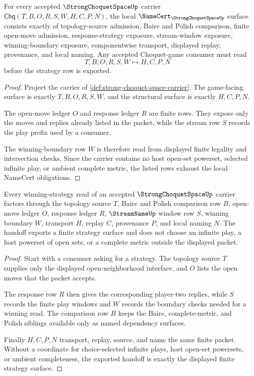 \begin{theorem}
\label{thm:strong-choquet-space-namecert-obligations}
For every accepted $\StrongChoquetSpaceUp$ carrier $\mathsf{Chq}(T,B,O,R,S,W,H,C,P,N)$, the local $\NameCert_{\StrongChoquetSpaceUp}$ surface consists exactly of topology-source admission, Baire and Polish comparison, finite open-move admission, response-strategy exposure, stream-window exposure, winning-boundary exposure, componentwise transport, displayed replay, provenance, and local naming. Any accepted Choquet-game consumer must read
$$
T,B,O,R,S,W \longmapsto H,C,P,N
$$
before the strategy row is exported.
\end{theorem}
\begin{proof}
Project the carrier of \autoref{def:strong-choquet-space-carrier}. The game-facing surface is exactly $T,B,O,R,S,W$, and the structural surface is exactly $H,C,P,N$.

The open-move ledger $O$ and response ledger $R$ are finite rows. They expose only the moves and replies already listed in the packet, while the stream row $S$ records the play prefix used by a consumer.

The winning-boundary row $W$ is therefore read from displayed finite legality and intersection checks. Since the carrier contains no host open-set powerset, selected infinite play, or ambient complete metric, the listed rows exhaust the local NameCert obligations.
\end{proof}

\begin{theorem}
\label{thm:strong-choquet-space-winning-strategy-handoff}
Every winning-strategy read of an accepted $\StrongChoquetSpaceUp$ carrier factors through the topology source $T$, Baire and Polish comparison row $B$, open-move ledger $O$, response ledger $R$, $\StreamNameUp$ window row $S$, winning boundary $W$, transport $H$, replay $C$, provenance $P$, and local naming $N$. The handoff exports a finite strategy surface and does not choose an infinite play, a host powerset of open sets, or a complete metric outside the displayed packet.
\end{theorem}
\begin{proof}
Start with a consumer asking for a strategy. The topology source $T$ supplies only the displayed open-neighborhood interface, and $O$ lists the open moves that the packet accepts.

The response row $R$ then gives the corresponding player-two replies, while $S$ records the finite play windows and $W$ records the boundary checks needed for a winning read. The comparison row $B$ keeps the Baire, complete-metric, and Polish siblings available only as named dependency surfaces.

Finally $H,C,P,N$ transport, replay, source, and name the same finite packet. Without a coordinate for choice-selected infinite plays, host open-set powersets, or ambient completeness, the exported handoff is exactly the displayed finite strategy surface.
\end{proof}

